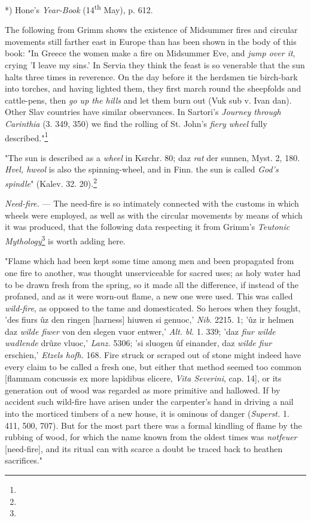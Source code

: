 \documentclass[a4paper, 11pt, oneside, polutonikogreek, english]{article}
\begin{document}
*) Hone's \emph{Year-Book} (14\textsuperscript{th} May), p. 612.

The following from Grimm shows the existence of Midsummer fires and circular movements still farther east in Europe than has been shown in the body of this book: "In Greece the women make a fire on Midsummer Eve, and \emph{jump over it}, crying 'I leave my sins.' In Servia they think the feast is so venerable that the sun halts three times in reverence. On the day before it the herdsmen tie birch-bark into torches, and having lighted them, they first march round the sheepfolds and cattle-pens, then \emph{go up the hills} and let them burn out (Vuk sub v. Ivan dan). Other Slav countries have similar observances. In Sartori's \emph{Journey through Carinthia} (3. 349, 350) we find the rolling of St. John's \emph{fiery wheel} fully described."\footnote{}

"The sun is described as a \emph{wheel} in Ksrchr. 80; daz \emph{rat} der sunnen, Myst. 2, 180. \emph{Hvel, hweol} is also the spinning-wheel, and in Finn. the sun is called \emph{God's spindle}" (Kalev. 32. 20).\footnote{}

\emph{Need-fire.} --- The need-fire is so intimately connected with the customs in which wheels were employed, as well as with the circular movements by means of which it was produced, that the following data respecting it from Grimm's \emph{Teutonic Mythology}\footnote{} is worth adding here.

"Flame which had been kept some time among men and been propagated from one fire to another, was thought unserviceable for sacred uses; as holy water had to be drawn fresh from the spring, so it made all the difference, if instead of the profaned, and as it were worn-out flame, a new one were used. This was called \emph{wild-fire}, as opposed to the tame and domesticated. So heroes when they fought, 'des fiurs ûz den ringen [harness] hiuwen si genuoc,' \emph{Nib.} 2215. 1; 'ûz ir helmen daz \emph{wilde fiwer} von den slegen vuor entwer,' \emph{Alt. bl.} 1. 339; 'daz \emph{fiur wilde wadlende} drûze vluoc,' \emph{Lanz.} 5306; 'si sluogen ûf einander, daz \emph{wilde fiur} erschien,' \emph{Etzels hofh.} 168. Fire struck or scraped out of stone might indeed have every claim to be called a fresh one, but either that method seemed too common [flammam concussis ex more lapidibus elicere, \emph{Vita Severini}, cap. 14], or its generation out of wood was regarded as more primitive and hallowed. If by accident such wild-fire have arisen under the carpenter's hand in driving a nail into the morticed timbers of a new house, it is ominous of danger (\emph{Superst.} 1. 411, 500, 707). But for the most part there was a formal kindling of flame by the rubbing of wood, for which the name known from the oldest times was \emph{notfeuer} [need-fire], and its ritual can with scarce a doubt be traced back to heathen sacrifices."
\end{document}
